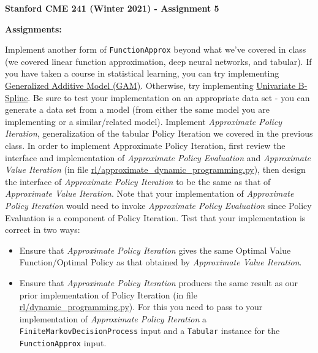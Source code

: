 \documentclass[12pt]{exam}
\begin{document}
\begin{center}
{\large {\bf Stanford CME 241 (Winter 2021) - Assignment 5}}
\end{center}
 
{\large{\bf Assignments:}}
\begin{questions}
	\question Implement another form of \lstinline{FunctionApprox} beyond what we've covered in class (we covered linear function approximation, deep neural networks, and tabular). If you have taken a course in statistical learning, you can try implementing \href{https://en.wikipedia.org/wiki/Generalized_additive_model}{Generalized Additive Model (GAM)}. Otherwise, try implementing \href{https://en.wikipedia.org/wiki/Spline_(mathematics)}{Univariate B-Spline}. Be sure to test your implementation on an appropriate data set - you can generate a data set from a model (from either the same model you are implementing or a similar/related model).
	 Implement {\em Approximate Policy Iteration}, generalization of the tabular Policy Iteration we covered in the previous class. In order to implement Approximate Policy Iteration, first review the interface and implementation of {\em Approximate Policy Evaluation} and {\em Approximate Value Iteration} (in file \href{https://github.com/TikhonJelvis/RL-book/blob/master/rl/approximate_dynamic_programming.py}{rl\//approximate\_dynamic\_programming.py}), then design the interface of {\em Approximate Policy Iteration} to be the same as that of {\em Approximate Value Iteration}. Note that your implementation of {\em Approximate Policy Iteration} would need to invoke {\em Approximate Policy Evaluation} since Policy Evaluation is a component of Policy Iteration. Test that your implementation is correct in two ways:
	\begin{itemize}
	\item Ensure that {\em Approximate Policy Iteration} gives the same Optimal Value Function/Optimal Policy as that obtained by {\em Approximate Value Iteration}.
	\item Ensure that {\em Approximate Policy Iteration} produces the same result as our prior implementation of Policy Iteration (in file \href{https://github.com/TikhonJelvis/RL-book/blob/master/rl/dynamic_programming.py}{rl\//dynamic\_programming.py}). For this you need to pass to your implementation of {\em Approximate Policy Iteration} a \lstinline{FiniteMarkovDecisionProcess} input and a \lstinline{Tabular} instance for the \lstinline{FunctionApprox} input.
	\end{itemize}
\end{questions}
\end{document}
